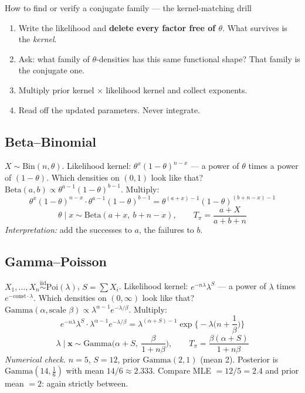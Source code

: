 \documentclass[11pt]{article}
\newcommand{\iid}{\overset{\text{iid}}{\sim}}
\begin{document}
\begin{recipe}{How to find or verify a conjugate family --- the kernel-matching drill}
\begin{enumerate}
\item Write the likelihood and \textbf{delete every factor free of $\theta$}. What survives is
the \emph{kernel}.
\item Ask: what family of $\theta$-densities has this same functional shape? That family is
the conjugate one.
\item Multiply prior kernel $\times$ likelihood kernel and collect exponents.
\item Read off the updated parameters. Never integrate.
\end{enumerate}
\end{recipe}

\subsection{Beta--Binomial}
$X\sim\mathrm{Bin}(n,\theta)$. Likelihood kernel: $\theta^{x}(1-\theta)^{n-x}$ --- a power of
$\theta$ times a power of $(1-\theta)$. Which densities on $(0,1)$ look like that?
$\mathrm{Beta}(a,b)\propto\theta^{a-1}(1-\theta)^{b-1}$. Multiply:
\[
\theta^{x}(1-\theta)^{n-x}\cdot\theta^{a-1}(1-\theta)^{b-1}=\theta^{(a+x)-1}(1-\theta)^{(b+n-x)-1}
\]
\[
\boxed{\ \theta\mid x\sim\mathrm{Beta}(a+x,\ b+n-x),\qquad
T_\pi=\frac{a+X}{a+b+n}\ }
\]
\emph{Interpretation:} add the successes to $a$, the failures to $b$.

\subsection{Gamma--Poisson}
$X_1,\dots,X_n\iid\mathrm{Poi}(\lambda)$, $S=\sum X_i$. Likelihood kernel:
$e^{-n\lambda}\lambda^{S}$ --- a power of $\lambda$ times $e^{-\text{const}\cdot\lambda}$.
Which densities on $(0,\infty)$ look like that? $\mathrm{Gamma}(\alpha,\text{scale }\beta)
\propto\lambda^{\alpha-1}e^{-\lambda/\beta}$. Multiply:
\[
e^{-n\lambda}\lambda^{S}\cdot\lambda^{\alpha-1}e^{-\lambda/\beta}
=\lambda^{(\alpha+S)-1}\exp\Big\{-\lambda\Big(n+\frac1\beta\Big)\Big\}
\]
\[
\boxed{\ \lambda\mid\mathbf x\sim\mathrm{Gamma}\Big(\alpha+S,\ \frac{\beta}{1+n\beta}\Big),
\qquad T_\pi=\frac{\beta(\alpha+S)}{1+n\beta}\ }
\]
\emph{Numerical check.} $n=5$, $S=12$, prior $\mathrm{Gamma}(2,1)$ (mean 2). Posterior is
$\mathrm{Gamma}(14,\tfrac16)$ with mean $14/6\approx2.333$. Compare MLE $=12/5=2.4$ and prior
mean $=2$: again strictly between. \checkmark
\end{document}
